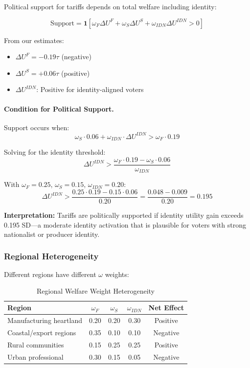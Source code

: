 Political support for tariffs depends on total welfare including identity:

\begin{equation}
\text{Support} = \mathbf{1}\left[\omega_F \Delta U^F + \omega_S \Delta U^S + \omega_{IDN} \Delta U^{IDN} > 0\right]
\label{eq:support}
\end{equation}

From our estimates:
\begin{itemize}
    \item $\Delta U^F = -0.19\tau$ (negative)
    \item $\Delta U^S = +0.06\tau$ (positive)
    \item $\Delta U^{IDN}$: Positive for identity-aligned voters
\end{itemize}

\paragraph{Condition for Political Support.}
Support occurs when:
\begin{equation}
\omega_S \cdot 0.06 + \omega_{IDN} \cdot \Delta U^{IDN} > \omega_F \cdot 0.19
\end{equation}

Solving for the identity threshold:
\begin{equation}
\Delta U^{IDN} > \frac{\omega_F \cdot 0.19 - \omega_S \cdot 0.06}{\omega_{IDN}}
\end{equation}

With $\omega_F = 0.25$, $\omega_S = 0.15$, $\omega_{IDN} = 0.20$:
\begin{equation}
\Delta U^{IDN} > \frac{0.25 \cdot 0.19 - 0.15 \cdot 0.06}{0.20} = \frac{0.048 - 0.009}{0.20} = 0.195
\end{equation}

\textbf{Interpretation:} Tariffs are politically supported if identity utility gain 
exceeds 0.195 SD---a moderate identity activation that is plausible for 
voters with strong nationalist or producer identity.

\subsubsection{Regional Heterogeneity}

Different regions have different $\omega$ weights:

\begin{table}[htbp]
\centering
\caption{Regional Welfare Weight Heterogeneity}
\label{tab:regional-weights}
\begin{tabular}{@{}lcccc@{}}
\toprule
\textbf{Region} & $\omega_F$ & $\omega_S$ & $\omega_{IDN}$ & \textbf{Net Effect} \\
\midrule
Manufacturing heartland & 0.20 & 0.20 & 0.30 & Positive \\
Coastal/export regions & 0.35 & 0.10 & 0.10 & Negative \\
Rural communities & 0.15 & 0.25 & 0.25 & Positive \\
Urban professional & 0.30 & 0.15 & 0.05 & Negative \\
\bottomrule
\end{tabular}
\end{table}

